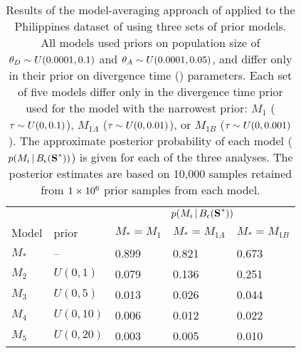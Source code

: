 \documentclass[letterpaper,12pt]{article}
\begin{document}
\begin{table}[htbp]
    \sffamily
    \addtolength{\tabcolsep}{-0.08cm}
    \caption{Results of the model-averaging approach of \citet{Hickerson2013}
        applied to the Philippines dataset of \citet{Oaks2012} using three sets
        of prior models. All models used priors on population size of
        $\meanDescendantTheta{} \sim U(0.0001,0.1)$ and $\ancestralTheta{} \sim
        U(0.0001, 0.05)$, and differ only in their prior on divergence time
        (\divt{}) parameters.  Each set of five models differ only in the
        divergence time prior used for the model with the narrowest prior:
        $M_1$ ($\tau_{} \sim U(0, 0.1)$), $M_{1A}$ ($\tau_{} \sim U(0, 0.01)$),
        or $M_{1B}$ ($\tau_{} \sim U(0, 0.001)$). The approximate posterior
        probability of each model ($p(M_i \given \ssSpace)$) is given for each
        of the three analyses.  The posterior estimates are based on 10,000
        samples retained from $1\times 10^{6}$ prior samples
    from each model.}
    \centering
    \begin{tabular}{ l l l l l }
        \toprule
        & & \multicolumn{3}{c}{$p(M_i \given \ssSpace)$} \\
        \cmidrule(){3-5}
        Model & \divt{} prior & $M_{*}=M_1$ & $M_{*}=M_{1A}$ & $M_{*}=M_{1B}$ \\
        \midrule
        $M_*$ & --        & 0.899 & 0.821 & 0.673 \\
        $M_2$ & $U(0,1)$  & 0.079 & 0.136 & 0.251 \\
        $M_3$ & $U(0,5)$  & 0.013 & 0.026 & 0.044 \\
        $M_4$ & $U(0,10)$ & 0.006 & 0.012 & 0.022 \\
        $M_5$ & $U(0,20)$ & 0.003 & 0.005 & 0.010 \\
        \bottomrule
    \end{tabular}
    \label{tabModelChoiceEmpirical}
\end{table}

\clearpage

\newpage


\end{document}
